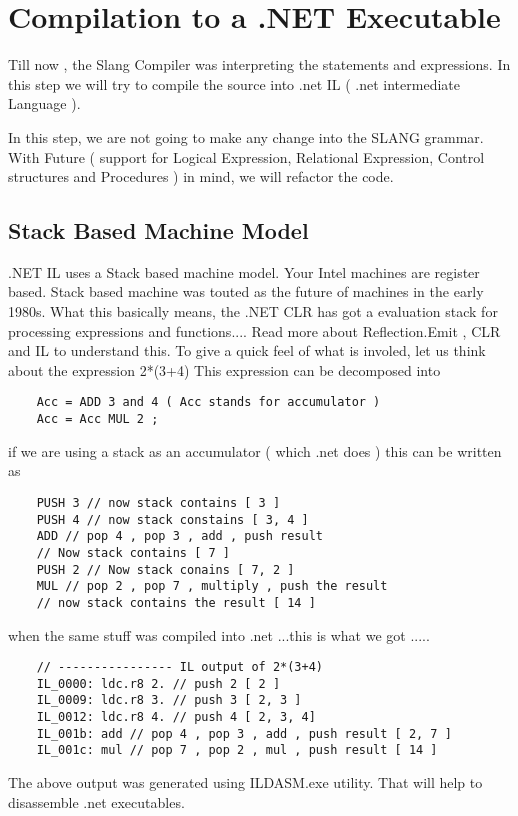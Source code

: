 \chapter{Compilation to a .NET Executable}
Till now , the Slang Compiler was interpreting the statements and expressions. In this step we will try to compile the source into .net IL ( .net intermediate Language ). 

In this step, we are not going to make any change into the SLANG grammar. With Future ( support for Logical Expression, Relational Expression, Control structures and Procedures ) in mind, we will refactor the code. 

\section{Stack Based Machine Model}
.NET IL uses a Stack based machine model. Your Intel machines are register based. Stack based machine was touted as the future of machines in the early 1980s. What this basically means, the .NET CLR has got a evaluation stack for processing expressions and functions.... Read more about Reflection.Emit , CLR and IL to understand this.
To give a quick feel of what is involed, let us think about the expression 2*(3+4) 
This expression can be decomposed into
\lstset{style=csharp}
\begin{lstlisting}
	Acc = ADD 3 and 4 ( Acc stands for accumulator )
	Acc = Acc MUL 2 ;
\end{lstlisting}

if we are using a stack as an accumulator ( which .net does ) this can be written as
\lstset{style=csharp}
\begin{lstlisting}
	PUSH 3 // now stack contains [ 3 ]
	PUSH 4 // now stack constains [ 3, 4 ]
	ADD // pop 4 , pop 3 , add , push result
	// Now stack contains [ 7 ]
	PUSH 2 // Now stack conains [ 7, 2 ]
	MUL // pop 2 , pop 7 , multiply , push the result
	// now stack contains the result [ 14 ]
\end{lstlisting}
when the same stuff was compiled into .net ...this is what we got .....
\lstset{style=csharp}
\begin{lstlisting}
	// ---------------- IL output of 2*(3+4)
	IL_0000: ldc.r8 2. // push 2 [ 2 ]
	IL_0009: ldc.r8 3. // push 3 [ 2, 3 ]
	IL_0012: ldc.r8 4. // push 4 [ 2, 3, 4]
	IL_001b: add // pop 4 , pop 3 , add , push result [ 2, 7 ]
	IL_001c: mul // pop 7 , pop 2 , mul , push result [ 14 ]
\end{lstlisting}
The above output was generated using ILDASM.exe utility. That will help to disassemble .net executables.
